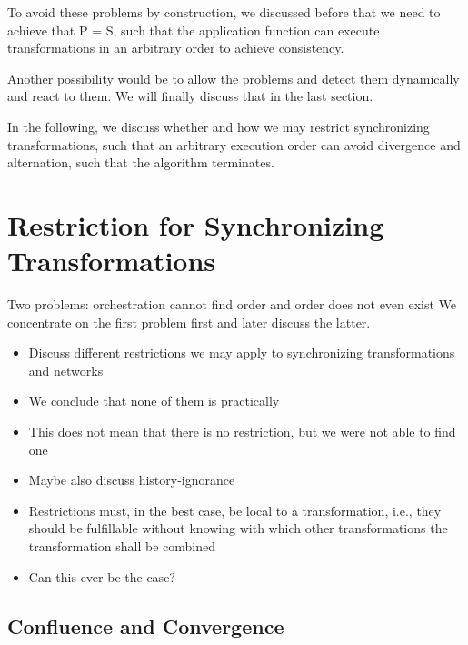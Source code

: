 To avoid these problems by construction, we discussed before that we need to achieve that P = S, such that the application function can execute transformations in an arbitrary order to achieve consistency.

Another possibility would be to allow the problems and detect them dynamically and react to them.
We will finally discuss that in the last section.

In the following, we discuss whether and how we may restrict synchronizing transformations, such that an arbitrary execution order can avoid divergence and alternation, such that the algorithm terminates.



\section{Restriction for Synchronizing Transformations}

Two problems: orchestration cannot find order and order does not even exist
We concentrate on the first problem first and later discuss the latter.

\begin{itemize}
    \item Discuss different restrictions we may apply to synchronizing transformations and networks
    \item We conclude that none of them is practically
    \item This does not mean that there is no restriction, but we were not able to find one
    \item Maybe also discuss history-ignorance
\end{itemize}

\begin{itemize}
    \item Restrictions must, in the best case, be local to a transformation, i.e., they should be fulfillable without knowing with which other transformations the transformation shall be combined
    \item Can this ever be the case?
\end{itemize}



\subsection{Confluence and Convergence}



